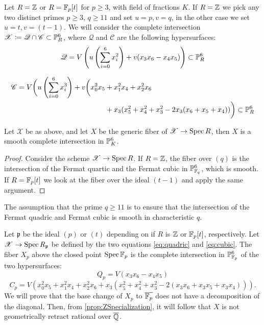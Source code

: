 Let $R = \Z$ or $R=\F_p[t]$ for $p \geq 3$, with field of fractions $K$. If $R=\Z$ we pick any two distinct primes $p \geq 3$, $q \geq 11$ and set $u=p,v=q$, in the other case we set $u=t,v=(t-1)$. We will consider the complete intersection $\mathscr{X} \coloneqq \mathscr{Q} \cap \mathscr{C} \subset \P_{R}^6$, where $\mathscr{Q}$ and $\mathscr{C}$ are the following hypersurfaces:
\begin{equation}
  \label{eq:quadric}
   \mathscr{Q} =V\left(  u \left(\sum_{i=0}^6 x_i^2 \right) + v(x_3x_6-x_4x_5) \right)  \subset \P_{R}^6
\end{equation}

\begin{align}
  \label{eq:cubic}
  \mathscr{C} = V\biggl( u \left(\sum_{i=0}^6 x_i^3 \right) + v\biggl(x_0^2x_5 &+ x_1^2x_4 + x_2^2x_6 \nonumber \\ &+ x_3(x_5^2+x_4^2+x_3^2 -2x_3(x_6 + x_5 + x_4)) \biggr) \subset \P_{R}^6
\end{align}

\begin{lemma}
  Let $\mathscr{X}$ be as above, and let $X$ be the generic fiber of $\mathscr{X} \to \Spec R$, then $X$ is a smooth complete intersection in $\P_{K}^6$.
\end{lemma}
\begin{proof}
  Consider the scheme $\mathscr{X} \to \Spec R$.  If $R=\Z$, the fiber over $(q)$ is the intersection of the Fermat quartic and the Fermat cubic in $\P_{\F_q }^6$, which is smooth. If $R=\F_p[t]$ we look at the fiber over the ideal $(t-1)$ and apply the same argument.
\end{proof}
\begin{remark}
\label{rmk:Characteristics}
  The assumption that the prime $q \geq 11$ is to ensure that the intersection of the Fermat quadric and Fermat cubic is smooth in characteristic $q$.
\end{remark}


Let $\mathfrak{p}$ be the ideal $(p)$ or $(t)$ depending on if $R$ is $\Z$ or $\F_p[t]$, respectively. Let $\mathscr{X} \to \Spec R_{\mathfrak{p}}$ be defined by the two equations \eqref{eq:quadric} and \eqref{eq:cubic}. The fiber $X_p$ above the closed point $\Spec \F_p$ is the complete intersection in $\P^6_{\F_p}$ of the two hypersurfaces:
\begin{equation}
  \label{eq:Qquadric}
  Q_p = V(x_3x_6-x_4x_5)
\end{equation}
\begin{equation}
  \label{eq:Qqubic}
  C_p = V \left(x_0^2x_5 + x_1^2x_4 + x_2^2x_6 + x_3(x_5^2+x_4^2+x_3^2 -2(x_3x_6 + x_3x_5 + x_3x_4)) \right).
\end{equation}
We will prove that the base change of $X_p$ to $\overline{\F_p}$ does not have a decomposition of the diagonal. Then, from \cref{prop:ZSpecialization}, it will follow that $X$ is not geometrically retract rational over $\overline{\Q}$.

